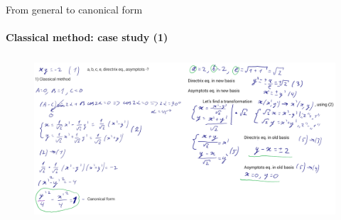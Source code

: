 \documentclass[aspectratio=169]{beamer}
\begin{document}
\begin{frame}[t]{From general to canonical form}
\framesubtitle{Classical method: case study (1)}
    \vspace{-0.6cm}
    \begin{figure}[H]
        \centering\includegraphics[height=6cm,width=1\textwidth,keepaspectratio]{classic.png}
        \label{fig:classic.png}
    \end{figure}
\end{frame}
\end{document}
